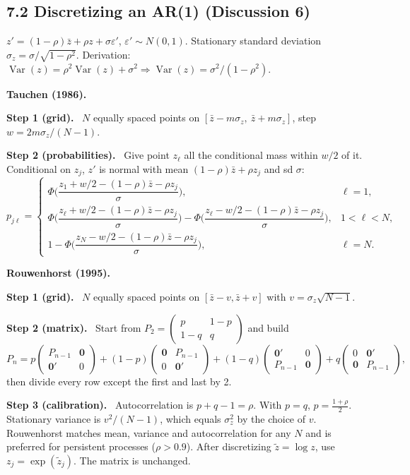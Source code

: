 \documentclass[12pt]{article}
\DeclareMathOperator{\Var}{Var}
\newcommand{\st}[1]{\par\smallskip\textbf{Step #1.}\ }
\begin{document}
\subsection*{7.2 Discretizing an AR(1) (Discussion 6)}
$z'=(1-\rho)\bar z+\rho z+\sigma\varepsilon'$, $\varepsilon'\sim N(0,1)$.
Stationary standard deviation $\sigma_z=\sigma/\sqrt{1-\rho^2}$.
Derivation: $\Var(z)=\rho^2\Var(z)+\sigma^2\Rightarrow\Var(z)=\sigma^2/(1-\rho^2)$.

\textbf{Tauchen (1986).}
\st{1 (grid)} $N$ equally spaced points on $[\bar z-m\sigma_z,\ \bar z+m\sigma_z]$, step $w=2m\sigma_z/(N-1)$.
\st{2 (probabilities)} Give point $z_\ell$ all the conditional mass within $w/2$ of it. Conditional on $z_j$, $z'$ is normal with mean $(1-\rho)\bar z+\rho z_j$ and sd $\sigma$:
\[
p_{j\ell}=\begin{cases}
\Phi\Big(\dfrac{z_1+w/2-(1-\rho)\bar z-\rho z_j}{\sigma}\Big), & \ell=1,\\[2ex]
\Phi\Big(\dfrac{z_\ell+w/2-(1-\rho)\bar z-\rho z_j}{\sigma}\Big)-\Phi\Big(\dfrac{z_\ell-w/2-(1-\rho)\bar z-\rho z_j}{\sigma}\Big), & 1<\ell<N,\\[2ex]
1-\Phi\Big(\dfrac{z_N-w/2-(1-\rho)\bar z-\rho z_j}{\sigma}\Big), & \ell=N.
\end{cases}
\]

\textbf{Rouwenhorst (1995).}
\st{1 (grid)} $N$ equally spaced points on $[\bar z-v,\bar z+v]$ with $v=\sigma_z\sqrt{N-1}$.
\st{2 (matrix)} Start from $P_2=\begin{pmatrix}p&1-p\\1-q&q\end{pmatrix}$ and build
\[
P_n=p\begin{pmatrix}P_{n-1}&\mathbf0\\\mathbf0'&0\end{pmatrix}+(1-p)\begin{pmatrix}\mathbf0&P_{n-1}\\0&\mathbf0'\end{pmatrix}+(1-q)\begin{pmatrix}\mathbf0'&0\\P_{n-1}&\mathbf0\end{pmatrix}+q\begin{pmatrix}0&\mathbf0'\\\mathbf0&P_{n-1}\end{pmatrix},
\]
then divide every row except the first and last by 2.
\st{3 (calibration)} Autocorrelation is $p+q-1=\rho$. With $p=q$, $p=\frac{1+\rho}{2}$.
Stationary variance is $v^2/(N-1)$, which equals $\sigma_z^2$ by the choice of $v$.
Rouwenhorst matches mean, variance and autocorrelation for any $N$ and is
preferred for persistent processes ($\rho>0.9$).
After discretizing $\tilde z=\log z$, use $z_j=\exp(\tilde z_j)$. The matrix is unchanged.
\end{document}
